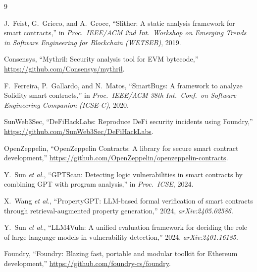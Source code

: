 \documentclass[conference]{IEEEtran}
\begin{document}
\begin{thebibliography}{9}

J.~Feist, G.~Grieco, and A.~Groce, ``Slither: A static analysis framework for smart contracts,''
in \emph{Proc.\ IEEE/ACM 2nd Int.\ Workshop on Emerging Trends in Software Engineering for
Blockchain (WETSEB)}, 2019.

Consensys, ``Mythril: Security analysis tool for EVM bytecode,'' \url{https://github.com/Consensys/mythril}.

F.~Ferreira, P.~Gallardo, and N.~Matos, ``SmartBugs: A framework to analyze Solidity smart
contracts,'' in \emph{Proc.\ IEEE/ACM 38th Int.\ Conf.\ on Software Engineering Companion
(ICSE-C)}, 2020.

SunWeb3Sec, ``DeFiHackLabs: Reproduce DeFi security incidents using Foundry,''
\url{https://github.com/SunWeb3Sec/DeFiHackLabs}.

OpenZeppelin, ``OpenZeppelin Contracts: A library for secure smart contract development,''
\url{https://github.com/OpenZeppelin/openzeppelin-contracts}.

Y.~Sun \emph{et al.}, ``GPTScan: Detecting logic vulnerabilities in smart contracts by combining
GPT with program analysis,'' in \emph{Proc.\ ICSE}, 2024.

X.~Wang \emph{et al.}, ``PropertyGPT: LLM-based formal verification of smart contracts through
retrieval-augmented property generation,'' 2024, \emph{arXiv:2405.02586}.

Y.~Sun \emph{et al.}, ``LLM4Vuln: A unified evaluation framework for deciding the role of large
language models in vulnerability detection,'' 2024, \emph{arXiv:2401.16185}.

Foundry, ``Foundry: Blazing fast, portable and modular toolkit for Ethereum development,''
\url{https://github.com/foundry-rs/foundry}.

\end{thebibliography}
\end{document}
